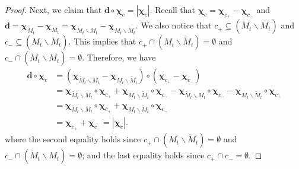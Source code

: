 \documentclass{article}
\newcommand{\del}{\backslash}
\renewcommand{\vec}[1]{\boldsymbol{#1}}
\renewcommand{\odot}{\circ}
\begin{document}
\begin{proof}
Next, we claim that $\vec d \odot \vec \chi_c = |\vec \chi_c|$.
Recall that $\vec\chi_c = \vec\chi_{c_+}-\vec\chi_{c_-}$
and $\vec d = \vec \chi_{\tilde M_t}-\vec \chi_{M_t} = \vec\chi_{\tilde M_t\del M_t} - \vec\chi_{M_t\del \tilde M_t}$.
We also notice that $c_+ \subseteq (\tilde M_t \del M_t)$ and $c_- \subseteq (M_t \del \tilde M_t)$.
This implies that $c_+ \cap (M_t \del \tilde M_t) = \emptyset$ and $c_-\cap (\tilde M_t \del M_t) = \emptyset$.
Therefore, we have
\begin{align*}
\vec d \odot \vec \chi_c &= (\vec\chi_{\tilde M_t\del M_t} - \vec\chi_{M_t\del \tilde M_t})\odot(\vec\chi_{c_+}-\vec\chi_{c_-})\\
&= \vec\chi_{\tilde M_t\del M_t}\odot \vec\chi_{c_+}+
   \vec\chi_{M_t \del \tilde M_t}\odot \vec\chi_{c_-}-
   \vec\chi_{\tilde M_t\del M_t}\odot \vec\chi_{c_-}-
   \vec\chi_{M_t\del \tilde M_t}\odot \vec\chi_{c_+}\\
&= \vec\chi_{\tilde M_t\del M_t}\odot \vec\chi_{c_+}+
   \vec\chi_{M_t \del \tilde M_t}\odot \vec\chi_{c_-} \\
&= \vec\chi_{c_+}+\vec\chi_{c_-} =|\vec\chi_c|. 
\end{align*}
where the second equality holds since $c_+ \cap (M_t \del \tilde M_t) = \emptyset$ and $c_-\cap (\tilde M_t \del M_t) = \emptyset$; and the last equality holds since $c_+\cap c_- =\emptyset$.


\end{proof}
\end{document}
